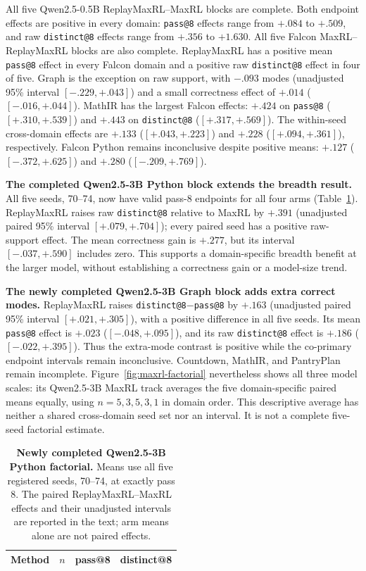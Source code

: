 \documentclass{article}
\newcommand{\1}{\mathbf 1}
\theoremstyle{remark}
\theoremstyle{definition}
\theoremstyle{plain}
\begin{document}
All five Qwen2.5-0.5B ReplayMaxRL--MaxRL blocks are complete. Both endpoint
effects are positive in every domain: \texttt{pass@8} effects range from
\(+.084\) to \(+.509\), and raw \texttt{distinct@8} effects range from
\(+.356\) to \(+1.630\). All five Falcon MaxRL--ReplayMaxRL blocks are also complete. ReplayMaxRL has a
positive mean \texttt{pass@8} effect in every Falcon domain and a positive raw
\texttt{distinct@8} effect in four of five. Graph is the exception on raw
support, with \(-.093\) modes (unadjusted 95\% interval
\([-.229,+.043]\)) and a small correctness effect of \(+.014\)
(\([-.016,+.044]\)). MathIR has the largest Falcon effects: \(+.424\) on
\texttt{pass@8} (\([+.310,+.539]\)) and \(+.443\) on
\texttt{distinct@8} (\([+.317,+.569]\)). The within-seed cross-domain
effects are \(+.133\) (\([+.043,+.223]\)) and \(+.228\)
(\([+.094,+.361]\)), respectively. Falcon Python remains inconclusive despite
positive means: \(+.127\) (\([-.372,+.625]\)) and \(+.280\)
(\([-.209,+.769]\)).

\textbf{The completed Qwen2.5-3B Python block extends the breadth result.}
All five seeds, 70--74, now have valid pass-8 endpoints for all four arms
(Table~\ref{tab:qwen3b-python-factorial}). ReplayMaxRL raises raw
\texttt{distinct@8} relative to MaxRL by \(+.391\)
(unadjusted paired 95\% interval \([+.079,+.704]\)); every paired seed has a
positive raw-support effect. The mean correctness gain is \(+.277\), but its
interval \([-.037,+.590]\) includes zero. This supports a domain-specific
breadth benefit at the larger model, without establishing a correctness gain
or a model-size trend.

\textbf{The newly completed Qwen2.5-3B Graph block adds extra correct modes.}
ReplayMaxRL raises \texttt{distinct@8}$-$\texttt{pass@8} by $+.163$
(unadjusted paired 95\% interval $[+.021,+.305]$), with a positive difference
in all five seeds. Its mean \texttt{pass@8} effect is $+.023$
($[-.048,+.095]$), and its raw \texttt{distinct@8} effect is $+.186$
($[-.022,+.395]$). Thus the extra-mode contrast is positive while the
co-primary endpoint intervals remain inconclusive. Countdown, MathIR, and
PantryPlan remain incomplete. Figure~\ref{fig:maxrl-factorial} nevertheless
shows all three model scales: its Qwen2.5-3B MaxRL track averages the five
domain-specific paired means equally, using $n=5,3,5,3,1$ in domain order.
This descriptive average has neither a shared cross-domain seed set nor an
interval. It is not a complete five-seed factorial estimate.

\begin{table}[H]
  \centering
  \caption{\textbf{Newly completed Qwen2.5-3B Python factorial.}
  Means use all five registered seeds, 70--74, at exactly pass 8.
  The paired ReplayMaxRL--MaxRL effects and their unadjusted intervals are
  reported in the text; arm means alone are not paired effects.}
  \label{tab:qwen3b-python-factorial}
  \small
  \begin{tabular}{@{}lrrr@{}}
    \toprule
    \textbf{Method} & \(n\) & \textbf{pass@8} & \textbf{distinct@8} \\
    \midrule
    
  \end{tabular}
\end{table}
\end{document}
